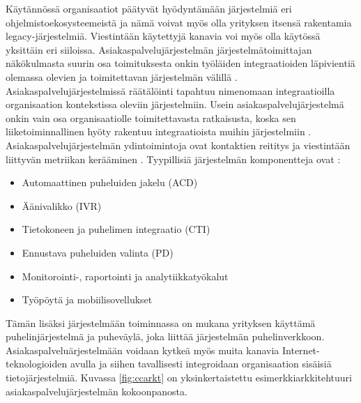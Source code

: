 \documentclass[finnish,12pt,a4paper,pdftex]{article}
\begin{document}
Käytännössä organisaatiot päätyvät hyödyntämään järjestelmiä eri ohjelmistoekosysteemeistä ja nämä voivat myös olla yrityksen itsensä rakentamia legacy-järjestelmiä. Viestintään käytettyjä kanavia voi myös olla käytössä yksittäin eri siiloissa. Asiakaspalvelujärjestelmän järjestelmätoimittajan näkökulmasta suurin osa toimituksesta onkin työläiden integraatioiden läpivientiä olemassa olevien ja toimitettavan järjestelmän välillä \citep{vcc, ccinfo}. Asiakaspalvelujärjestelmissä räätälöinti tapahtuu nimenomaan integraatioilla organisaation kontekstissa oleviin järjestelmiin. Usein asiakaspalvelujärjestelmä onkin vain osa organisaatiolle toimitettavasta ratkaisusta, koska sen liiketoiminnallinen hyöty rakentuu integraatioista muihin järjestelmiin \citep{bernier}.\\

Asiakaspalvelujärjestelmän ydintoimintoja ovat kontaktien reititys ja viestintään liittyvän metriikan kerääminen \citep{vcc}. Tyypillisiä järjestelmän komponentteja ovat \citep{bernier}:

\begin{itemize}
\setlength{\itemsep}{0pt}
    \item Automaattinen puheluiden jakelu (ACD)
    \item Äänivalikko (IVR)
    \item Tietokoneen ja puhelimen integraatio (CTI)
    \item Ennustava puheluiden valinta (PD)
    \item Monitorointi-, raportointi ja analytiikkatyökalut
    \item Työpöytä ja mobiilisovellukset
\end{itemize}

Tämän lisäksi järjestelmään toiminnassa on mukana yrityksen käyttämä puhelinjärjestelmä ja puheväylä, joka liittää järjestelmän puhelinverkkoon. Asiakaspalveluärjestelmään voidaan kytkeä myös muita kanavia Internet-teknologioiden avulla ja siihen tavallisesti integroidaan organisaation sisäisiä tietojärjestelmiä. Kuvassa \ref{fig:ccarkt} on yksinkertaistettu esimerkkiarkkitehtuuri asiakaspalvelujärjestelmän kokoonpanosta. 
\end{document}
